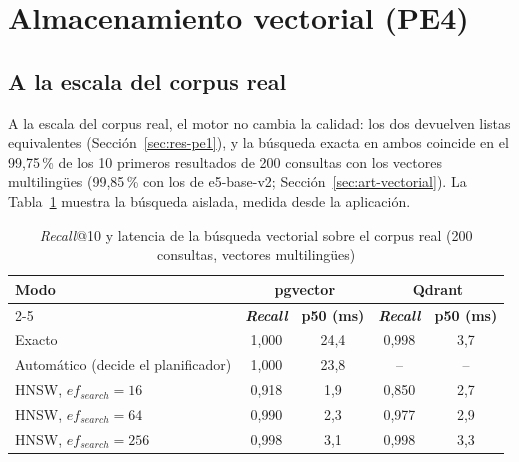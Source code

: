 \section{Almacenamiento vectorial (PE4)}
\label{sec:res-pe4}

\subsection{A la escala del corpus real}

A la escala del corpus real, el motor no cambia la calidad: los dos devuelven listas equivalentes (Sección~\ref{sec:res-pe1}), y la búsqueda exacta en ambos coincide en el 99,75\,\% de los 10 primeros resultados de 200 consultas con los vectores multilingües (99,85\,\% con los de e5-base-v2; Sección~\ref{sec:art-vectorial}). La Tabla~\ref{tab:res-ann-real} muestra la búsqueda aislada, medida desde la aplicación.

\begin{table}[htbp!]
    \centering
    \caption{\textit{Recall}@10 y latencia de la búsqueda vectorial sobre el corpus real (200 consultas, vectores multilingües)}
    \label{tab:res-ann-real}
    \begin{tabular}{|l|c|c|c|c|}
        \hline
        \multirow{2}{*}{\textbf{Modo}} & \multicolumn{2}{c|}{\textbf{pgvector}} & \multicolumn{2}{c|}{\textbf{Qdrant}} \\
        \cline{2-5}
         & \textbf{\textit{Recall}} & \textbf{p50 (ms)} & \textbf{\textit{Recall}} & \textbf{p50 (ms)} \\
        \hline
        Exacto & 1{,}000 & 24,4 & 0{,}998 & 3,7 \\
        \hline
        Automático (decide el planificador) & 1{,}000 & 23,8 & -- & -- \\
        \hline
        HNSW, $ef_{search} = 16$ & 0{,}918 & 1,9 & 0{,}850 & 2,7 \\
        \hline
        HNSW, $ef_{search} = 64$ & 0{,}990 & 2,3 & 0{,}977 & 2,9 \\
        \hline
        HNSW, $ef_{search} = 256$ & 0{,}998 & 3,1 & 0{,}998 & 3,3 \\
        \hline
    \end{tabular}
\end{table}

